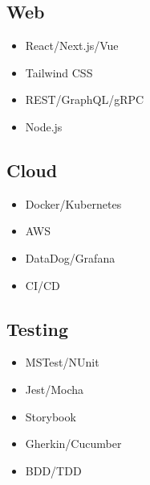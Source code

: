 \documentclass{article}
\begin{document}
\begin{paracol}{2}
\begin{leftcolumn}
    \vspace{0.5em}

    \subsection{Web}
    \begin{itemize}
      \item React/Next.js/Vue
      \item Tailwind CSS
      \item REST/GraphQL/gRPC
      \item Node.js
    \end{itemize}

    \vspace{0.5em}

    \subsection{Cloud}
    \begin{itemize}
      \item Docker/Kubernetes
      \item AWS 
      \item DataDog/Grafana
      \item CI/CD
    \end{itemize}

    \pagebreak

    \subsection{Testing}
    \begin{itemize}
      \item MSTest/NUnit
      \item Jest/Mocha
      \item Storybook
      \item Gherkin/Cucumber
      \item BDD/TDD
    \end{itemize}

    \vspace{0.5em}


\end{leftcolumn}
\end{paracol}
\end{document}
